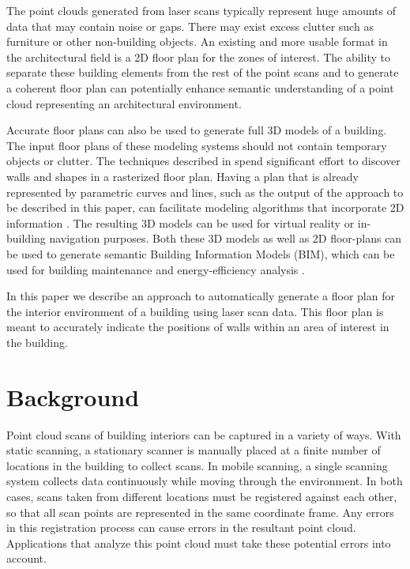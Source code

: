 \documentclass[10pt,twocolumn,letterpaper]{article}
\begin{document}
The point clouds generated from laser scans typically represent huge amounts of data that may contain noise or gaps.  There may exist excess clutter such as furniture or other non-building objects.  An existing and more usable format in the architectural field is a 2D floor plan for the zones of interest.  The ability to separate these building elements from the rest of the point scans and to generate a coherent floor plan can potentially enhance semantic understanding of a point cloud representing an architectural environment.

Accurate floor plans can also be used to generate full 3D models of a building.  The input floor plans of these modeling systems should not contain temporary objects or clutter. The techniques described in \cite{Lewis98, Or05} spend significant effort to discover walls and shapes in a rasterized floor plan. Having a plan that is already represented by parametric curves and lines, such as the output of the approach to be described in this paper, can facilitate modeling algorithms that incorporate 2D information \cite{Castles07, Hakim05, Lewis98, Or05}.  The resulting 3D models can be used for virtual reality or in-building navigation purposes.  Both these 3D models as well as 2D floor-plans can be used to generate semantic Building Information Models (BIM), which can be used for building maintenance and energy-efficiency analysis \cite{Tang10}.

In this paper we describe an approach to automatically generate a floor plan for the interior environment of a building using laser scan data.  This floor plan is meant to accurately indicate the positions of walls within an area of interest in the building.  
 
\section{Background}

Point cloud scans of building interiors can be captured in a variety of ways.  With static scanning, a stationary scanner is manually placed at a finite number of locations in the building to collect scans.  In mobile scanning, a single scanning system collects data continuously while moving through the environment.  In both cases, scans taken from different locations must be registered against each other, so that all scan points are represented in the same coordinate frame.  Any errors in this registration process can cause errors in the resultant point cloud.  Applications that analyze this point cloud must take these potential errors into account.
\end{document}
